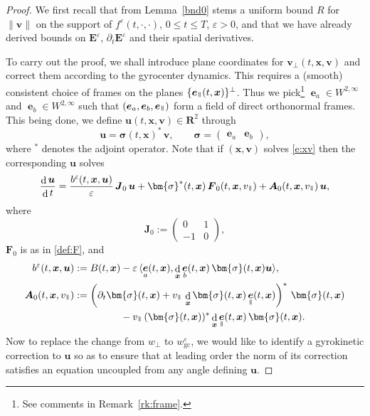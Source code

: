 \documentclass[JEP,XML,SOM,Unicode]{cedram}
\newcommand{\sperp}{{\scriptscriptstyle\perp}}
\let\eps\varepsilon
\let\d\partial
\DeclareMathOperator\dD{d}\let\dd\dD
\theoremstyle{plain}
\theoremstyle{definition}
\newcommand{\be}{\begin{equation}}
\newcommand{\ee}{\end{equation}}
\newcommand\R{\mathbf R}
\newcommand\bA{{\boldsymbol A}}
\newcommand\bE{{\boldsymbol E}}
\newcommand\bF{{\boldsymbol F}}
\newcommand\bJ{{\boldsymbol J}}
\newcommand\bfu{{\boldsymbol u}}
\newcommand\bfv{{\boldsymbol v}}
\newcommand\bfx{{\boldsymbol x}}
\newcommand\bfsigma{\bm{\sigma}}
\DeclareMathOperator{\beD}{\boldsymbol{e}}
\newcommand\eDpar{\beD_\mypar}
\newcommand\eDa{\beD_a}
\newcommand\eDb{\beD_b}
\newcommand\vpar{v_\mypar}
\newcommand\bvperp{\bfv_{\!\sperp}}
\newcommand\eperp{w_{\!\sperp}}
\newcommand{\eGC}{w_\mathrm{gc}}
\newcommand{\mypar}{{\mkern3mu\vphantom{\perp}\vrule depth 0pt\mkern2mu\vrule depth 0pt\mkern3mu}}
\begin{document}
\begin{proof}
We first recall that from Lemma~\ref{bnd0} stems a uniform bound $R$ for $\|\bfv\|$ on the support of $f^\eps(t,\cdot,\cdot)$, $0\leq t\leq T$, $\eps>0$, and that we have already derived bounds on $\bE^\eps$, $\d_t\bE^\eps$ and their spatial derivatives.

To carry out the proof, we shall introduce plane coordinates for $\bvperp(t,\bfx,\bfv)$ and correct them according to the gyrocenter dynamics. This requires a (smooth) consistent choice of frames on the planes $\{\eDpar(t,\bfx)\}^\perp$. Thus we pick\footnote{See comments in Remark~\ref{rk:frame}.} $\eDa\in W^{2,\infty}$ and $\eDb\in W^{2,\infty}$ such that $(\eDa,\eDb,\eDpar)$ form a field of direct orthonormal frames. This being done, we define $\bfu(t,\bfx,\bfv)\in \R^2$ through
\be
\label{def:u}
\bfu=\bfsigma(t,\bfx)^*\,\bfv,\qquad
\bfsigma=\begin{pmatrix}\eDa&\eDb
\end{pmatrix},
\ee
where ${}^*$ denotes the adjoint operator. Note that if $(\bfx,\bfv)$ solves \eqref{e:xv} then the corresponding $\bfu$ solves
\be
\label{e:u}
\frac{\dD\bfu}{\dD t}=
\frac{b^\eps(t,\bfx,\bfu)}{\eps}\, \bJ_0\,\bfu
+\bfsigma^*(t,\bfx)\,\bF_0(t,\bfx,\vpar)+\bA_0(t,\bfx,\vpar)\,\bfu,
\ee
where
\be\label{def:J0}
\bJ_0:=\begin{pmatrix}0&1\\-1&0\end{pmatrix},
\ee
$\bF_0$ is as in \eqref{def:F}, and
\begin{align}
\label{def:b0}
b^\eps(t,\bfx,\bfu)&:=
B(t,\bfx)-\eps\,\langle\eDa(t,\bfx),
\dD_\bfx\eDb(t,\bfx)\,\bfsigma(t,\bfx)\bfu\rangle,
\\
\label{def:bA0}
\bA_0(t,\bfx,\vpar)&:=
\left(\d_t\bfsigma(t,\bfx)+\vpar\,\dD_\bfx\bfsigma(t,\bfx)\eDpar(t,\bfx)\right)^*\,\bfsigma(t,\bfx)\\
&\hphantom{{}:=
B(t,\bfx)}-\vpar\,(\bfsigma(t,\bfx))^*\dD_\bfx\eDpar(t,\bfx)\,\bfsigma(t,\bfx).\notag
\end{align}
Now to replace the change from $\eperp$ to $\eGC^\eps$, we would like to identify a gyrokinetic correction to $\bfu$ so as to ensure that at leading order the norm of its correction satisfies an equation uncoupled from any angle defining $\bfu$.


\end{proof}
\end{document}
